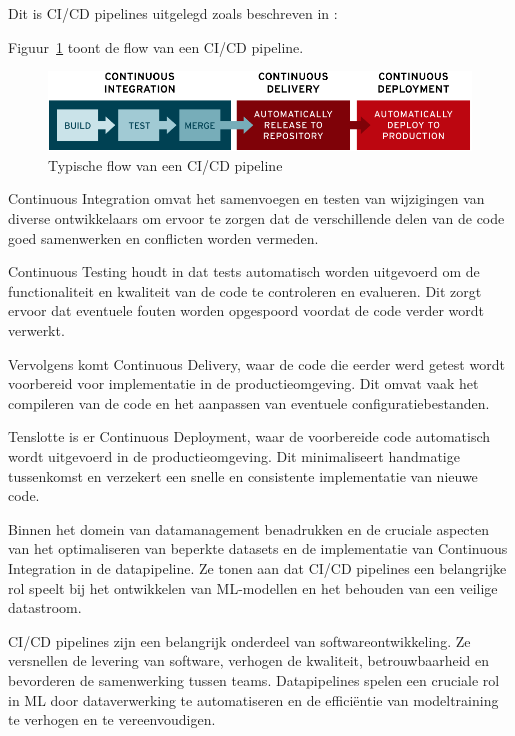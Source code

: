 
Dit is CI/CD pipelines uitgelegd zoals beschreven in \textcite{NaveenVemuri2024}:

Figuur~\ref{fig:CICD_flow} toont de flow van een CI/CD pipeline. 

\begin{figure}[h]
    \includegraphics[width=\linewidth]{graphics/cdci.png}
    \caption{Typische flow van een CI/CD pipeline \autocite{RedHat2023}}
    \label{fig:CICD_flow}
\end{figure}

Continuous Integration omvat het samenvoegen en testen van wijzigingen van diverse ontwikkelaars om ervoor te zorgen dat de verschillende delen van de code goed samenwerken en conflicten worden vermeden.

Continuous Testing houdt in dat tests automatisch worden uitgevoerd om de functionaliteit en kwaliteit van de code te controleren en evalueren. Dit zorgt ervoor dat eventuele fouten worden opgespoord voordat de code verder wordt verwerkt.

Vervolgens komt Continuous Delivery, waar de code die eerder werd getest wordt voorbereid voor implementatie in de productieomgeving. Dit omvat vaak het compileren van de code en het aanpassen van eventuele configuratiebestanden.

Tenslotte is er Continuous Deployment, waar de voorbereide code automatisch wordt uitgevoerd in de productieomgeving. Dit minimaliseert handmatige tussenkomst en verzekert een snelle en consistente implementatie van nieuwe code.\newline


Binnen het domein van datamanagement benadrukken \textcite{Samad2018} en \textcite{Vadavalasa2020} de cruciale aspecten van het optimaliseren van beperkte datasets en de implementatie van Continuous Integration in de datapipeline. Ze tonen aan dat CI/CD pipelines een belangrijke rol speelt bij het ontwikkelen van ML-modellen en het behouden van een veilige datastroom.

CI/CD pipelines zijn een belangrijk onderdeel van softwareontwikkeling. Ze versnellen de levering van software, verhogen de kwaliteit, betrouwbaarheid en bevorderen de samenwerking tussen teams. Datapipelines spelen een cruciale rol in ML door dataverwerking te automatiseren en de efficiëntie van modeltraining te verhogen en te vereenvoudigen.
